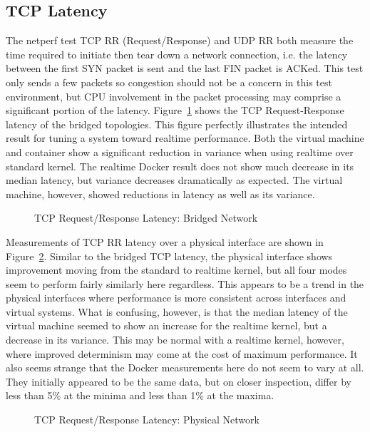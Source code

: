 \subsection{TCP Latency} %
\label{sub:tcplatency}
The netperf test TCP RR (Request/Response) and UDP RR both measure the time required to initiate then tear down a network connection, i.e. the latency between the first SYN packet is sent and the last FIN packet is ACKed.  
This test only sends a few packets so congestion should not be a concern in this test environment, but CPU involvement in the packet processing may comprise a significant portion of the latency.  
Figure~\ref{fig:tcp_rr_bridge} shows the TCP Request-Response latency of the bridged topologies.
This figure perfectly illustrates the intended result for tuning a system toward realtime performance.
Both the virtual machine and container show a significant reduction in variance when using realtime over standard kernel.
The realtime Docker result does not show much decrease in its median latency, but variance decreases dramatically as expected.
The virtual machine, however, showed reductions in latency as well as its variance.

\begin{figure}
    \centering
    \def\svgwidth{\columnwidth}
    
    \caption{TCP Request/Response Latency: Bridged Network}
    \label{fig:tcp_rr_bridge}
\end{figure}

Measurements of TCP RR latency over a physical interface are shown in Figure~\ref{fig:tcp_rr_phys}.  
Similar to the bridged TCP latency, the physical interface shows improvement moving from the standard to realtime kernel, but all four modes seem to perform fairly similarly here regardless.
This appears to be a trend in the physical interfaces where performance is more consistent across interfaces and virtual systems.
What is confusing, however, is that the median latency of the virtual machine seemed to show an increase for the realtime kernel, but a decrease in its variance.  
This may be normal with a realtime kernel, however, where improved determinism may come at the cost of maximum performance.  
It also seems strange that the Docker measurements here do not seem to vary at all.  
They initially appeared to be the same data, but on closer inspection, differ by less than 5\% at the minima and less than 1\% at the maxima.

\begin{figure}
    \centering
    \def\svgwidth{\columnwidth}
    
    \caption{TCP Request/Response Latency: Physical Network}
    \label{fig:tcp_rr_phys}
\end{figure}

